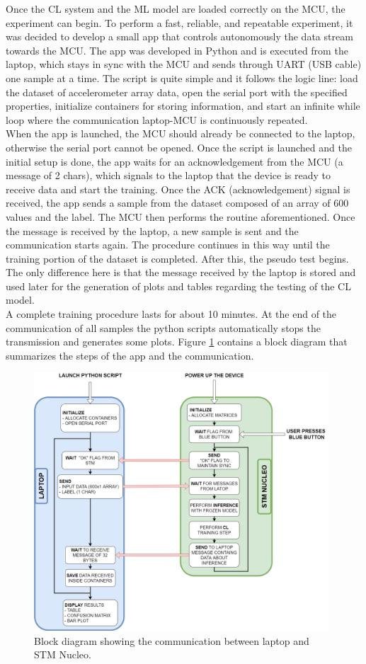 \documentclass[12pt]{report}
\begin{document}
Once the CL system and the ML model are loaded correctly on the MCU, the experiment can begin. To perform a fast, reliable, and repeatable experiment, it was decided to develop a small app that controls autonomously the data stream towards the MCU. The app was developed in Python and is executed from the laptop, which stays in sync with the MCU and sends through UART (USB cable) one sample at a time. The script is quite simple and it follows the logic line: load the dataset of accelerometer array data, open the serial port with the specified properties, initialize containers for storing information, and start an infinite while loop where the communication laptop-MCU is continuously repeated. \\
When the app is launched, the MCU should already be connected to the laptop, otherwise the serial port cannot be opened. Once the script is launched and the initial setup is done, the app waits for an acknowledgement from the MCU (a message of 2 chars), which signals to the laptop that the device is ready to receive data and start the training. Once the ACK (acknowledgement) signal is received, the app sends a sample from the dataset composed of an array of 600 values and the label. The MCU then performs the routine aforementioned. Once the message is received by the laptop, a new sample is sent and the communication starts again. The procedure continues in this way until the training portion of the dataset is completed. After this, the pseudo test begins. The only difference here is that the message received by the laptop is stored and used later for the generation of plots and tables regarding the testing of the CL model.\\
A complete training procedure lasts for about 10 minutes. At the end of the communication of all samples the python scripts automatically stops the transmission and generates some plots. Figure \ref{fig:python_stm_diagram} contains a block diagram that summarizes the steps of the app and the communication.

\begin{figure}[h!]
    \centering    \includegraphics[width=110mm]{Figures/Chapter4/python_nucleo.png} 
    \caption{Block diagram showing the communication between laptop and STM Nucleo.}
    \label{fig:python_stm_diagram}    
\end{figure}
\end{document}
